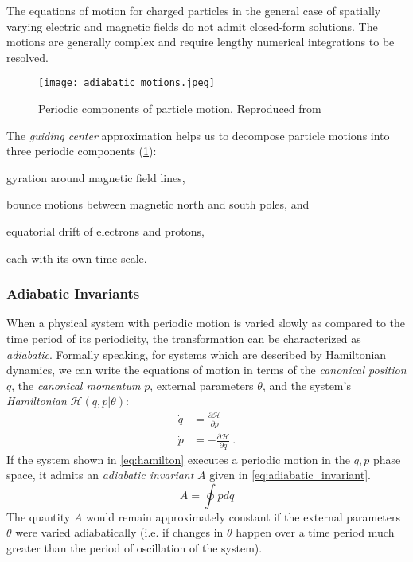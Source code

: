 The equations of motion for charged particles in the general case of spatially varying electric and 
magnetic fields do not admit closed-form solutions. The motions are generally complex and require 
lengthy numerical integrations to be resolved.
%
\begin{figure}[ht]
    \centering\texttt{[image: adiabatic\_motions.jpeg]}
    \caption{
        {\small 
        Periodic components of particle motion. Reproduced from \citet{roederer2012dynamics}
        }
    }
    \label{fig:particlemotions}
\end{figure}
%

The \emph{guiding center} approximation helps us to decompose particle motions into three periodic 
components (\cref{fig:particlemotions}):
%
\begin{enumerate*}
    \item gyration around magnetic field lines, 
    \item bounce motions between magnetic north and south poles, and
    \item equatorial drift of electrons and protons, 
\end{enumerate*}
%
each with its own time scale.

\subsubsection*{Adiabatic Invariants}

When a physical system with periodic motion is varied slowly as compared to the time period of 
its periodicity, the transformation can be characterized as \emph{adiabatic}. 
Formally speaking, for systems which are described by Hamiltonian dynamics, we can write the 
equations of motion in terms of the \emph{canonical position} $q$, the \emph{canonical momentum} 
$p$, external parameters $\theta$, and the system's \emph{Hamiltonian} $\mathcal{H}(q,p|\theta)$: 
%
\begin{equation}\label{eq:hamilton}
    \begin{aligned}
        \dot q &= \frac{\partial \mathcal{H}}{\partial p}\\
        \dot p &= - \frac{\partial \mathcal{H}}{\partial q} \ .
    \end{aligned}
\end{equation}
%
If the system shown in \cref{eq:hamilton} executes a periodic motion in the $q,p$ phase 
space, it admits an \emph{adiabatic invariant} $A$ given in \cref{eq:adiabatic_invariant}.
%
\begin{equation}\label{eq:adiabatic_invariant}
    A = \oint p d q
\end{equation}
%
The quantity $A$ would remain approximately constant if the external parameters $\theta$ were 
varied adiabatically (i.e. if changes in $\theta$ happen over a time period much greater than 
the period of oscillation of the system).

